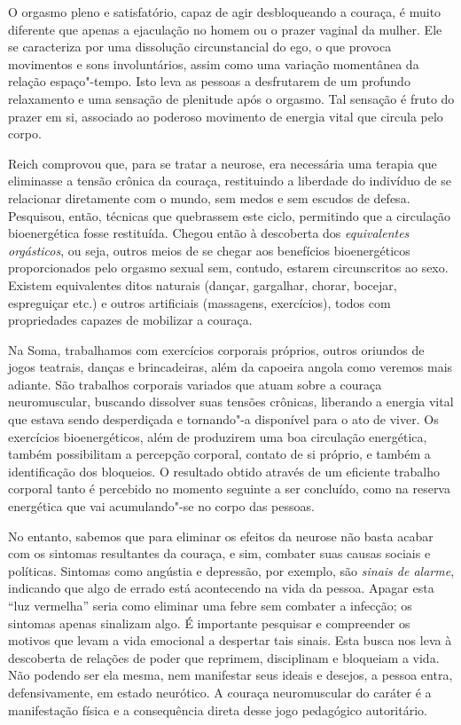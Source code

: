 O orgasmo pleno e satisfatório, capaz de agir desbloqueando a couraça, é
muito diferente que apenas a ejaculação no homem ou o prazer vaginal da
mulher. Ele se caracteriza por uma dissolução circunstancial do ego, o
que provoca movimentos e sons involuntários, assim como uma variação
momentânea da relação espaço"-tempo. Isto leva as pessoas a desfrutarem
de um profundo relaxamento e uma sensação de plenitude após o orgasmo.
Tal sensação é fruto do prazer em si, associado ao poderoso movimento %
de energia vital que circula pelo corpo.

Reich comprovou que, para se tratar a neurose, era necessária uma
terapia que eliminasse a tensão crônica da couraça, restituindo a
liberdade do indivíduo de se relacionar diretamente com o mundo, sem
medos e sem escudos de defesa. Pesquisou, então, técnicas que quebrassem
este ciclo, permitindo que a circulação bioenergética fosse restituída.
Chegou então à descoberta dos \emph{equivalentes orgásticos}, ou seja,
outros meios de se chegar aos benefícios bioenergéticos proporcionados
pelo orgasmo sexual sem, contudo, estarem circunscritos ao sexo. Existem
equivalentes ditos naturais (dançar, gargalhar, chorar, bocejar,
espreguiçar etc.) e outros artificiais (massagens, exercícios), todos
com propriedades capazes de mobilizar a couraça.

Na Soma, trabalhamos com exercícios corporais próprios, outros oriundos
de jogos teatrais, danças e brincadeiras, além da capoeira angola como
veremos mais adiante. São trabalhos corporais variados que atuam sobre a
couraça neuromuscular, buscando dissolver suas tensões crônicas,
liberando a energia vital que estava sendo desperdiçada e tornando"-a
disponível para o ato de viver. Os exercícios bioenergéticos, além de
produzirem uma boa circulação energética, também possibilitam a
percepção corporal, contato de si próprio, e também a identificação
dos bloqueios. O resultado obtido através de um eficiente trabalho
corporal tanto é percebido no momento seguinte a ser concluído, como na
reserva energética que vai acumulando"-se no corpo das pessoas.

No entanto, sabemos que para eliminar os efeitos da neurose não basta
acabar com os sintomas resultantes da couraça, e sim, combater suas
causas sociais e políticas. Sintomas como angústia e depressão, por
exemplo, são \emph{sinais de alarme}, indicando que algo de errado está
acontecendo na vida da pessoa. Apagar esta ``luz vermelha'' seria como
eliminar uma febre sem combater a infecção; os sintomas apenas sinalizam
algo. É importante pesquisar e compreender os motivos que levam a vida
emocional a despertar tais sinais. Esta busca nos leva à descoberta de
relações de poder que reprimem, disciplinam e bloqueiam a vida. Não
podendo ser ela mesma, nem manifestar seus ideais e desejos, a pessoa
entra, defensivamente, em estado neurótico. A couraça neuromuscular do
caráter é a manifestação física e a consequência direta desse jogo
pedagógico autoritário.

